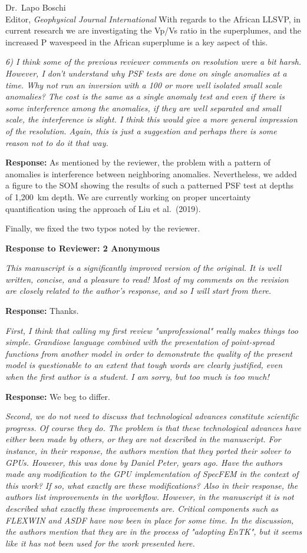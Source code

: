 \documentclass[11pt,a4paper]{letter}
\newcommand{\response}[1]{\textbf{Response:} #1}
\newcommand{\rev}[1]{{\it{#1}}}
\begin{document}
\begin{letter}{Dr.~Lapo Boschi\\
Editor, \textit{Geophysical Journal International}}
{With regards to the African LLSVP,
in current research we are investigating the Vp/Vs ratio in the superplumes, and the increased P wavespeed in the African superplume is a key aspect of this.
}

\rev{
6) I think some of the previous reviewer comments on resolution were a bit harsh. However, I don't understand why PSF tests are done on single anomalies at a time. Why not run an inversion with a 100 or more well isolated small scale anomalies? The cost is the same as a single anomaly test and even if there is some interference among the anomalies, if they are well separated and small scale, the interference is slight. I think this would give a more general impression of the resolution. Again, this is just a suggestion and perhaps there is some reason not to do it that way.
}

\response{
As mentioned by the reviewer, the problem with a pattern of anomalies is interference between neighboring anomalies.
Nevertheless, we added a figure to the SOM showing the results of such a patterned PSF test at depths of 1,200~km depth.
We are currently working on proper uncertainty quantification using the approach of Liu et al.~(2019).

Finally, we fixed the two typos noted by the reviewer.
}

{\textbf{\large Response to Reviewer: 2 Anonymous}}

\rev{
This manuscript is a significantly improved version of the original. It is well written, concise, and a pleasure to read! Most of my comments on the revision are closely related to the author's response, and so I will start from there.
}

\response{
Thanks.
}

\rev{
First, I think that calling my first review "unprofessional" really makes things too simple. Grandiose language combined with the presentation of point-spread functions from another model in order to demonstrate the quality of the present model is questionable to an extent that tough words are clearly justified, even when the first author is a student. I am sorry, but too much is too much!
}

\response{
We beg to differ.
}

\rev{
Second, we do not need to discuss that technological advances constitute scientific progress. Of course they do. The problem is that these technological advances have either been made by others, or they are not described in the manuscript. 
For instance, in their response, the authors mention that they ported their solver to GPUs. However, this was done by Daniel Peter, years ago. Have the authors made any modification to the GPU implementation of SpecFEM in the context of this work? If so, what exactly are these modifications?
Also in their response, the authors list improvements in the workflow. However, in the manuscript it is not described what exactly these improvements are. Critical components such as FLEXWIN and ASDF have now been in place for some time. In the discussion, the authors mention that they are in the process of "adopting EnTK", but it seems like it has not been used for the work presented here.
}


\end{letter}
\end{document}

